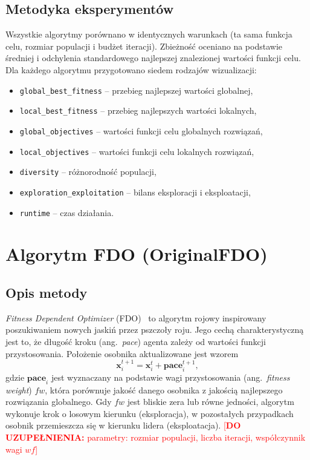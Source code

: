 \documentclass[12pt,a4paper]{article}
\newcommand{\todo}[1]{\textcolor{red}{[\textbf{DO UZUPEŁNIENIA:} #1]}}
\begin{document}
\subsection{Metodyka eksperymentów}

Wszystkie algorytmy porównano w identycznych warunkach (ta sama funkcja celu,
rozmiar populacji i budżet iteracji). Zbieżność oceniano na podstawie
średniej i odchylenia standardowego najlepszej znalezionej wartości funkcji celu.
Dla każdego algorytmu przygotowano siedem rodzajów wizualizacji:
\begin{itemize}
    \item \texttt{global\_best\_fitness} -- przebieg najlepszej wartości globalnej,
    \item \texttt{local\_best\_fitness} -- przebieg najlepszych wartości lokalnych,
    \item \texttt{global\_objectives} -- wartości funkcji celu globalnych rozwiązań,
    \item \texttt{local\_objectives} -- wartości funkcji celu lokalnych rozwiązań,
    \item \texttt{diversity} -- różnorodność populacji,
    \item \texttt{exploration\_exploitation} -- bilans eksploracji i eksploatacji,
    \item \texttt{runtime} -- czas działania.
\end{itemize}

\section{Algorytm FDO (OriginalFDO)}\label{sec:fdo}

\subsection{Opis metody}

\textit{Fitness Dependent Optimizer} (FDO)~\cite{abdullah2019fdo} to algorytm rojowy
inspirowany poszukiwaniem nowych jaskiń przez pszczoły roju. Jego cechą charakterystyczną
jest to, że długość kroku (ang.\ \textit{pace}) agenta zależy od wartości funkcji
przystosowania. Położenie osobnika aktualizowane jest wzorem
\begin{equation}
    \mathbf{x}_i^{t+1} = \mathbf{x}_i^{t} + \mathbf{pace}_i^{t+1},
\end{equation}
gdzie $\mathbf{pace}_i$ jest wyznaczany na podstawie wagi przystosowania
(ang.\ \textit{fitness weight}) $fw$, która porównuje jakość danego
osobnika z jakością najlepszego rozwiązania globalnego. Gdy $fw$ jest bliskie
zera lub równe jedności, algorytm wykonuje krok o losowym kierunku (eksploracja),
w pozostałych przypadkach osobnik przemieszcza się w kierunku lidera
(eksploatacja). \todo{parametry: rozmiar populacji, liczba iteracji, współczynnik
wagi $wf$}
\end{document}
